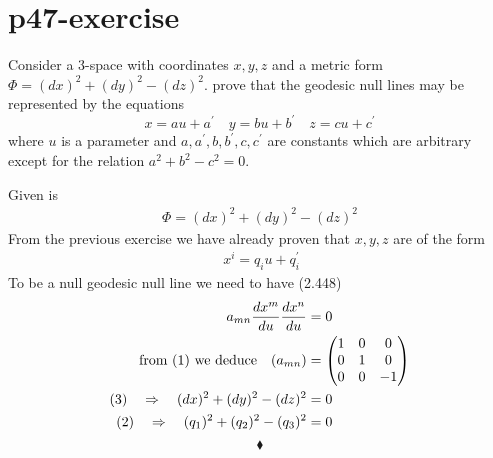 \section{p47-exercise }
\begin{tcolorbox}
Consider a 3-space with coordinates $x,y,z$ and a metric form $\Phi = (dx)^2+(dy)^2 - (dz)^2$. prove that the geodesic null lines may be represented by the equations
$$x = au + a^{'}\quad y = bu + b^{'} \quad z = cu + c^{'}$$
where $u$ is a parameter and $a, a^{'},b,b^{'},c,c^{'}$ are constants which are arbitrary except for the relation $a^2+b^2-c^2 =0$.
\end{tcolorbox}
Given is 
\begin{align}
\Phi = (dx)^2+(dy)^2 - (dz)^2
\end{align}
From the previous exercise we have already proven that $x,y,z$ are of the form
\begin{align}
\ x^i = q_i u + q_i^{'}
\end{align}
To be a null geodesic null line we need to have (2.448)
\begin{align}
\ a_{mn}\dv{x^m}{u}\dv{x^n}{u} &=0\\
\text{from (1) we deduce}  \quad (a_{mn}) &= \begin{pmatrix}
1& 0 & 0 \\
 0&1  & 0 \\
 0&  0& -1 \\
\end{pmatrix}\\
\text{(3)}\quad\Rightarrow\quad (dx)^2+(dy)^2 - (dz)^2 &=0\\
\text{(2)}\quad\Rightarrow\quad (q_1)^2+(q_2)^2 - (q_3)^2 &=0
\end{align}
$$\blacklozenge$$
\newpage


